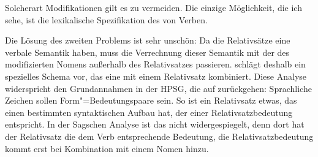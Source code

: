\zl
Solcherart Modifikationen gilt es zu vermeiden. Die einzige Möglichkeit, die ich sehe, ist die
lexikalische Spezifikation des \modwes von Verben.

Die Lösung des zweiten Problems ist sehr unschön: Da die Relativsätze eine verbale Semantik haben,
muss die Verrechnung dieser Semantik mit der des modifizierten Nomens außerhalb des Relativsatzes
passieren. \citet[]{Sag97a} schlägt deshalb ein spezielles Schema vor, das eine \nbar mit
einem Relativsatz kombiniert. Diese Analyse widerspricht den Grundannahmen in der HPSG, die auf
\citet{Saussure16a-de} zurückgehen: Sprachliche Zeichen sollen Form"=Bedeutungspaare sein. So ist ein
Relativsatz etwas, das einen bestimmten syntaktischen Aufbau hat, der einer Relativsatzbedeutung
entspricht. In der Sagschen Analyse ist das nicht widergespiegelt, denn dort hat der Relativsatz die
dem Verb entsprechende Bedeutung, die Relativsatzbedeutung kommt erst bei Kombination mit einem
Nomen hinzu.

